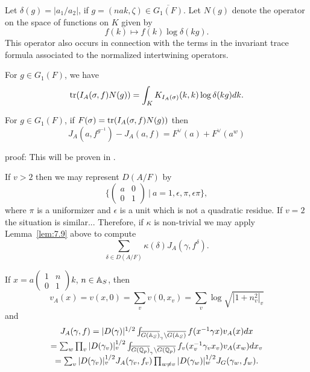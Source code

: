 Let $\delta(g)=|a_1/a_2|$, if $g=(nak,\zeta)\in \overline{G_1(F)}$. Let
$N(g)$ denote the operator on the space of functions on $K$ given by
\[
f(k)\longmapsto f(k)\log\delta(kg).
\]
This operator also occurs in connection with the terms in the
invariant trace formula associated to the normalized intertwining
operators.

\begin{lemma}\label{lem:7.8}
For $g\in G_1(F)$, we have
\[
{\rm tr}(I_A(\sigma,f)N(g))
=\int_K K_{I_A(\sigma)}(k,k)\log\delta(kg)dk.
\]
\end{lemma}

\begin{lemma}\label{lem:7.9}
For $g\in G_1(F)$, if
$F(\sigma)={\rm tr}(I_A(\sigma,f)N(g))$ then
\[
J_A(a,f^{g^{-1}})-J_A(a,f)
=F^\vee(a)+F^\vee(a^w)
\]
\end{lemma}
proof: This will be proven in \cite{J3}.

If $v>2$ then we may represent $D(A/F)$ by
\[
\{
\left(
\begin{array}{cc}
a&0\\
0&1
\end{array}
\right)\ |\ a=1,\epsilon, \pi, \epsilon\pi \},
\]
where $\pi$ is a uniformizer and $\epsilon$ is a unit
which is not a quadratic residue. If $v=2$ the situation is similar...
Therefore, if $\kappa$ is non-trivial
we may apply Lemma~\ref{lem:7.9} above to compute
\[
\sum_{\delta\in D(A/F)}
\kappa(\delta)J_A(\gamma,f^\delta).
\]

If $x=a
\left(
\begin{array}{cc}
1&n\\
0&1
\end{array}
\right) k$, $n\in \mathbb{A} _S$, then
\begin{equation}\label{eq:7.13}
v_A(x)
=v(x,0)=\sum_v v(0,x_v)=
\sum_v \log\sqrt{|1+n_v^2|_v}
\end{equation}
and
\begin{equation}\label{eq:7.14}
\begin{array}{c}
J_A(\gamma,f)
=|D(\gamma)|^{1/2}
\int_{\overline{G(\mathbb{A} _S)}_\gamma
\backslash \overline{G(\mathbb{A} _S)}}
f(x^{-1}\gamma x)v_A(x)dx\\
=
\sum_w\prod_v
|D(\gamma_v)|_v^{1/2}
\int_{\overline{G(\mathbb{Q} _p)}_\gamma
\backslash \overline{G(\mathbb{Q} _p)}}
f_v(x_v^{-1}\gamma_v x_v)v_A(x_w)dx_v\\
=\sum_v |D(\gamma_v)|_v^{1/2} J_A(\gamma_v,f_v)
\prod_{w\not= v}|D(\gamma_w)|_w^{1/2} J_G(\gamma_w,f_w).
\end{array}
\end{equation}

